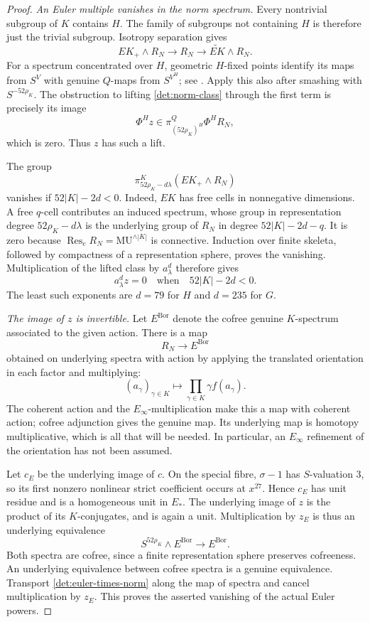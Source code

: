 \documentclass[11pt]{article}
\theoremstyle{definition}
\theoremstyle{remark}
\numberwithin{equation}{section}
\begin{document}
\begin{proof}
\emph{An Euler multiple vanishes in the norm spectrum.}
Every nontrivial subgroup of \(K\) contains \(H\).
The family of subgroups not containing \(H\) is therefore
just the trivial subgroup.  Isotropy separation gives
\[
 EK_+\wedge R_N\longrightarrow R_N
             \longrightarrow \widetilde{EK}\wedge R_N .
\]
For a spectrum concentrated over \(H\), geometric \(H\)-fixed
points identify its maps from \(S^V\) with genuine \(Q\)-maps
from \(S^{V^H}\); see \cite[Section~2.4]{GreenleesShipley}.
Apply this also after smashing with \(S^{-52\rho_K}\).
The obstruction to lifting \eqref{det:norm-class} through
the first term is precisely its image
\[
 \Phi^H z\in
 \pi_{(52\rho_K)^H}^{Q}\Phi^H R_N,
\]
which is zero.  Thus \(z\) has such a lift.

The group
\[
 \pi_{52\rho_K-d\lambda}^K(EK_+\wedge R_N)
\]
vanishes if \(52|K|-2d<0\).
Indeed, \(EK\) has free cells in nonnegative dimensions.
A free \(q\)-cell contributes an induced spectrum, whose
group in representation degree \(52\rho_K-d\lambda\) is
the underlying group of \(R_N\) in degree
\(52|K|-2d-q\).  It is zero because
\(\operatorname{Res}_eR_N=\mathrm{MU}^{\wedge |K|}\) is connective.
Induction over finite skeleta, followed by compactness of a
representation sphere, proves the vanishing.
Multiplication of the lifted class by \(a_\lambda^d\)
therefore gives
\begin{equation}\label{det:euler-times-norm}
 a_\lambda^d z=0
 \quad\text{when}\quad 52|K|-2d<0.
\end{equation}
The least such exponents are \(d=79\) for \(H\) and
\(d=235\) for \(G\).

\emph{The image of \(z\) is invertible.}
Let \(E^{\mathrm{Bor}}\) denote the cofree genuine
\(K\)-spectrum associated to the given action.
There is a map
\[
 R_N\longrightarrow E^{\mathrm{Bor}}
\]
obtained on underlying spectra with action by applying the
translated orientation in each factor and multiplying:
\[
 (a_\gamma)_{\gamma\in K}\longmapsto
          \prod_{\gamma\in K}\gamma f(a_\gamma).
\]
The coherent action and the \(E_\infty\)-multiplication
make this a map with coherent action; cofree adjunction
gives the genuine map.
Its underlying map is homotopy multiplicative, which is
all that will be needed.  In particular, an \(E_\infty\)
refinement of the orientation has not been assumed.

Let \(c_E\) be the underlying image of \(c\).
On the special fibre, \(\sigma-1\) has \(S\)-valuation \(3\),
so its first nonzero nonlinear strict coefficient occurs
at \(x^{27}\).  Hence \(c_E\) has unit residue and is a
homogeneous unit in \(E_*\).
The underlying image of \(z\) is the product of its
\(K\)-conjugates, and is again a unit.
Multiplication by \(z_E\) is thus an underlying equivalence
\[
 S^{52\rho_K}\wedge E^{\mathrm{Bor}}
       \longrightarrow E^{\mathrm{Bor}}.
\]
Both spectra are cofree, since a finite representation
sphere preserves cofreeness.  An underlying equivalence
between cofree spectra is a genuine equivalence.
Transport \eqref{det:euler-times-norm} along the map of
spectra and cancel multiplication by \(z_E\).
This proves the asserted vanishing of the actual Euler
powers.


\end{proof}
\end{document}
